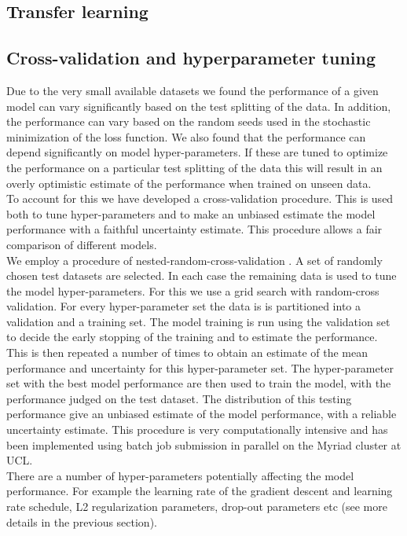 \documentclass[NOTE, disdraft=true, UKenglish]{\DISCDTLATEXPATH UCLCDTDISdoc}
\begin{document}
\subsection{Transfer learning}
\subsection{Cross-validation and hyperparameter tuning}
Due to the very small available datasets we found the performance of a given model can vary significantly based on the test splitting of the data. In addition, the performance can vary based on the random seeds used in the stochastic minimization of the loss function. We also found that the performance can depend significantly on model hyper-parameters. If these are tuned to optimize the performance on a particular test splitting of the data this will result in an overly optimistic estimate of the performance when trained on unseen data.
\\ \indent To account for this we have developed a cross-validation procedure. This is used both to tune hyper-parameters and to make an unbiased estimate the model performance with a faithful uncertainty estimate. This procedure allows a fair comparison of different models.
\\ \indent We employ a procedure of nested-random-cross-validation \cite{}. A set of randomly chosen test datasets  are selected. In each case the remaining data is used to tune the model hyper-parameters. For this we use a grid search with random-cross validation. For every hyper-parameter set the data is is partitioned into a validation and a training set. The model training is run using the validation set to decide the early stopping of the training and to estimate the performance. This is then repeated a number of times to obtain an estimate of the mean performance and uncertainty for this hyper-parameter set. The hyper-parameter set with the best model performance are then used to train the model, with the performance judged on the test dataset. The distribution of this testing performance give an unbiased estimate of the model performance, with a reliable uncertainty estimate. This procedure is very computationally intensive and has been implemented using batch job submission in parallel on the Myriad cluster at UCL.
\\ \indent There are a number of hyper-parameters potentially affecting the model performance. For example the learning rate of the gradient descent and learning rate schedule, L2 regularization parameters, drop-out parameters etc (see more details in the previous section). 
\end{document}

